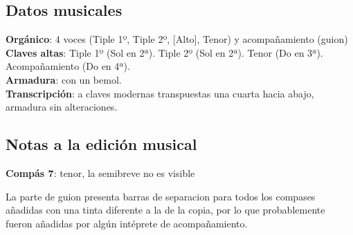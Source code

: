 
\subsection*{Datos musicales}

\noindent \textbf{Orgánico}: 4 voces (Tiple 1º, Tiple 2º, [Alto], Tenor) y acompañamiento (guion)\\
\textbf{Claves altas}: Tiple 1º (Sol en 2ª). Tiple 2º (Sol en 2ª). Tenor (Do en 3ª). Acompañamiento (Do en 4ª).\\
\textbf{Armadura}: con un bemol.\\
\textbf{Transcripción}: a claves modernas transpuestas una cuarta hacia abajo, armadura sin alteraciones.


\subsection*{Notas a la edición musical}

\noindent \textbf{Compás 7}: tenor, la semibreve no es visible


\noindent La parte de guion presenta barras de separacion para todos los compases añadidas con una tinta diferente a la de la copia, por lo que probablemente fueron añadidas por algún intéprete de acompañamiento.

